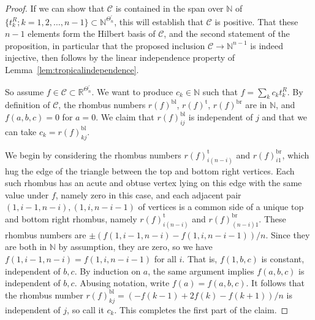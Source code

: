\documentclass[12pt,
	]{amsart}
\theoremstyle{definition}
\newcommand{\mrm}[1]{\mathrm{#1}}
\newcommand{\mbb}[1]{\mathbb{#1}}
\newcommand{\mcal}[1]{\mathcal{#1}}
\newcommand{\nnegZ}{\mbb{N}}
\newcommand{\R}{\mbb{R}}
\newcommand{\discrete}{\Theta_n}
\newcommand{\cornerlessdiscrete}{\discrete^\prime}
\newcommand{\fan}{\mcal{C}}
\begin{document}
\begin{proof}
If we can show that $\fan$ is contained in the span over $\nnegZ$ of $\{t_k^R;k=1,2,\dots,n-1\}\subset\nnegZ^{\cornerlessdiscrete}$, this will establish that $\fan$ is positive.  That these $n-1$ elements form the Hilbert basis of $\fan$, and the second statement of the proposition, in particular that the proposed inclusion $\fan\to\nnegZ^{n-1}$ is indeed injective, then follows by the linear independence property of Lemma~\ref{lem:tropicalindependence}.  

So assume $f\in\fan\subset\R^{\cornerlessdiscrete}$.  We want to produce $c_k\in\nnegZ$ such that $f=\sum_k c_k t^R_k$.  By definition of $\fan$, the rhombus numbers $r(f)^\mrm{bl}$, $r(f)^\mrm{t}$, $r(f)^\mrm{br}$ are in $\nnegZ$, and $f(a,b,c)=0$ for $a=0$.  We claim that $r(f)^\mrm{bl}_{ij}$ is independent of $j$ and that we can take $c_k=r(f)^\mrm{bl}_{kj}$.  

We begin by considering the rhombus numbers $r(f)^\mrm{t}_{i(n-i)}$ and $r(f)^\mrm{br}_{i1}$, which hug the edge of the triangle between the top and bottom right vertices.  Each such rhombus has an acute and obtuse vertex lying on this edge with the same value under $f$, namely zero in this case, and each adjacent pair $(1,i-1,n-i),(1,i,n-i-1)$ of vertices is a common side of a unique top and bottom right rhombus, namely $r(f)^\mrm{t}_{i(n-i)}$ and $r(f)^\mrm{br}_{(n-i)1}$.  These rhombus numbers are $\pm (f(1,i-1,n-i)-f(1,i,n-i-1))/n$.  Since they are both in $\nnegZ$ by assumption, they are zero, so we have $f(1,i-1,n-i)=f(1,i,n-i-1)$ for all $i$.  That is, $f(1,b,c)$ is constant, independent of $b,c$.  By induction on $a$, the same argument implies $f(a,b,c)$ is independent of $b,c$.  Abusing notation, write $f(a)=f(a,b,c)$.  It follows that the rhombus number $r(f)^\mrm{bl}_{kj}=(-f({k-1})+2f(k)-f({k+1}))/n$ is independent of $j$, so call it $c_k$.  This completes the first part of the claim.  


\end{proof}
\end{document}

